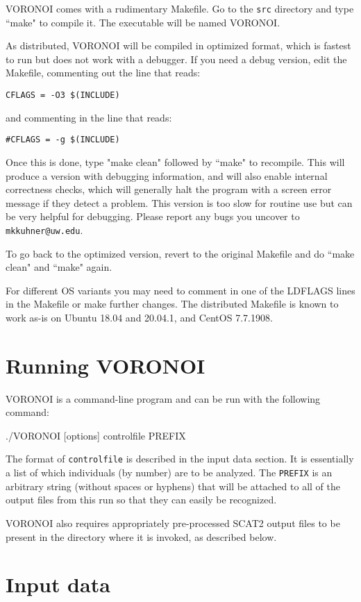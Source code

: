 \documentclass[10pt,titlepage,times,letterpaper]{article}
\begin{document}
VORONOI comes with a rudimentary Makefile.  Go to the {\tt src} directory
and type ``make" to compile it.  The executable will be named VORONOI.

As distributed, VORONOI will be compiled in optimized format, which is
fastest to run but does not work with a debugger.  If you need a debug
version, edit the Makefile, commenting out the line that reads:

{\tt CFLAGS = -O3 \$(INCLUDE)}

and commenting in the line that reads:

{\tt \#CFLAGS = -g \$(INCLUDE)}

Once this is done, type "make clean" followed by ``make" to recompile.  
This will produce a version with debugging information, and will also
enable internal correctness checks, which will generally
halt the program with a screen error message if they detect a problem.  
This version is too slow for routine use but can be very helpful for debugging.
Please report any bugs you uncover to {\tt mkkuhner@uw.edu}.

To go back to the optimized version, revert to the original Makefile
and do ``make clean" and ``make" again.

For different OS variants you may need to comment in one of 
the LDFLAGS lines in the Makefile or make further changes.  The 
distributed Makefile is known to work as-is on Ubuntu 18.04 and 
20.04.1, and CentOS 7.7.1908.  


\section{Running VORONOI}

VORONOI is a command-line program and can be run with the following command:

./VORONOI [options] controlfile PREFIX

The format of {\tt controlfile} is described in the input data section.  It is essentially a list
of which individuals (by number) are to be analyzed.  The {\tt PREFIX} is an arbitrary string (without
spaces or hyphens) that will be attached to all of the output files from this run so that they can
easily be recognized.

VORONOI also requires appropriately pre-processed SCAT2 output files to be present in the
directory where it is invoked, as described below.

\section{Input data}
\end{document}
